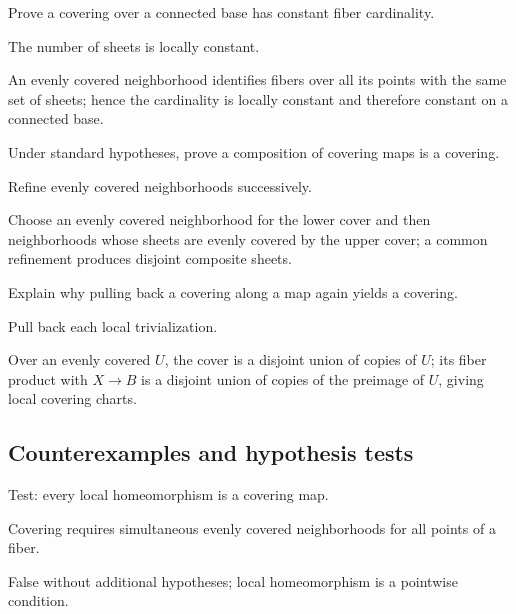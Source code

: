 \begin{exercise}\label{exr:viii10-ped-07}
Prove a covering over a connected base has constant fiber cardinality.
\end{exercise}
\begin{hint}
The number of sheets is locally constant.
\end{hint}
\begin{solution}
An evenly covered neighborhood identifies fibers over all its points with the same set of sheets; hence the cardinality is locally constant and therefore constant on a connected base.
\end{solution}

\begin{exercise}[Composition]\label{exr:viii10-ped-08}
Under standard hypotheses, prove a composition of covering maps is a covering.
\end{exercise}
\begin{hint}
Refine evenly covered neighborhoods successively.
\end{hint}
\begin{solution}
Choose an evenly covered neighborhood for the lower cover and then neighborhoods whose sheets are evenly covered by the upper cover; a common refinement produces disjoint composite sheets.
\end{solution}

\begin{exercise}\label{exr:viii10-ped-09}
Explain why pulling back a covering along a map again yields a covering.
\end{exercise}
\begin{hint}
Pull back each local trivialization.
\end{hint}
\begin{solution}
Over an evenly covered $U$, the cover is a disjoint union of copies of $U$; its fiber product with $X\to B$ is a disjoint union of copies of the preimage of $U$, giving local covering charts.
\end{solution}

\subsection*{Counterexamples and hypothesis tests}

\begin{exercise}\label{exr:viii10-ped-10}
Test: every local homeomorphism is a covering map.
\end{exercise}
\begin{hint}
Covering requires simultaneous evenly covered neighborhoods for all points of a fiber.
\end{hint}
\begin{solution}
False without additional hypotheses; local homeomorphism is a pointwise condition.
\end{solution}


